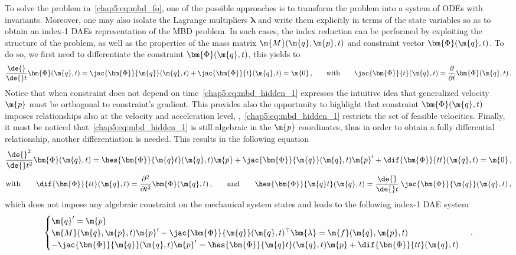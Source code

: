 To solve the problem in~\eqref{chap5:eq:mbd_fo}, one of the possible approaches is to transform the problem into a system of \acp{ODE} with invariants. Moreover, one may also isolate the Lagrange multipliers $\bm{\lambda}$ and write them explicitly in terms of the state variables so as to obtain an index-1 \acp{DAE} representation of the \ac{MBD} problem. In such cases, the index reduction can be performed by exploiting the structure of the problem, as well as the properties of the mass matrix $\m{M}(\m{q}, \m{p}, t)$ and constraint vector $\bm{\Phi}(\m{q}, t)$. To do so, we first need to differentiate the constraint $\bm{\Phi}(\m{q}, t)$, this yields to
%
\begin{equation}
  \dfrac{\de{}}{\de{} t}\bm{\Phi}(\m{q}, t) = \jac{\bm{\Phi}}{\m{q}}(\m{q}, t) + \jac{\bm{\Phi}}{t}(\m{q}, t) = \m{0}
  \, \text{,}
  \qquad \text{with} \qquad \jac{\bm{\Phi}}{t}(\m{q}, t) = \dfrac{\partial}{\partial t}\bm{\Phi}(\m{q}, t)
  \, \text{.}
  \label{chap5:eq:mbd_hidden_1}
\end{equation}
%
Notice that when constraint does not depend on time~\eqref{chap5:eq:mbd_hidden_1} expresses the intuitive idea that generalized velocity $\m{p}$ must be orthogonal to constraint's gradient. This provides also the opportunity to highlight that constraint $\bm{\Phi}(\m{q}, t)$ imposes relationships also at the velocity and acceleration level, \ie{},~\eqref{chap5:eq:mbd_hidden_1} restricts the set of feasible velocities. Finally, it must be noticed that~\eqref{chap5:eq:mbd_hidden_1} is still algebraic in the $\m{p}$ coordinates, thus in order to obtain a fully differential relationship, another differentiation is needed. This results in the following equation
%
\begin{equation}
  \dfrac{\de{}^2}{\de{}t^2}\bm{\Phi}(\m{q}, t) = \hes{\bm{\Phi}}{\m{q}t}(\m{q}, t)\m{p} + \jac{\bm{\Phi}}{\m{q}}(\m{q}, t)\m{p}^{\prime} + \dif{\bm{\Phi}}{tt}(\m{q}, t) = \m{0} \, \text{,}
  \label{chap5:eq:mbd_hidden_2}
\end{equation}
\begin{equation*}
  \text{with} \qquad
  \dif{\bm{\Phi}}{tt}(\m{q}, t) = \dfrac{\partial^2}{\partial t^2}\bm{\Phi}(\m{q}, t) \, \text{,}
  \qquad \text{and} \qquad
  \hes{\bm{\Phi}}{\m{q}t}(\m{q}, t) = \dfrac{\de{}}{\de{} t}\,\jac{\bm{\Phi}}{\m{q}}(\m{q}, t) \, \text{,}
\end{equation*}
%
which does not impose any algebraic constraint on the mechanical system states and leads to the following index-1 \ac{DAE} system
%
\begin{equation}
  \begin{cases}
    \m{q}^{\prime} = \m{p} \\
    \m{M}(\m{q}, \m{p}, t)\m{p}^{\prime} - \jac{\bm{\Phi}}{\m{q}}(\m{q}, t)^{\top}\bm{\lambda} = \m{f}(\m{q},\m{p},t) \\
    -\jac{\bm{\Phi}}{\m{q}}(\m{q}, t)\m{p}^{\prime} = \hes{\bm{\Phi}}{\m{q}t}(\m{q}, t)\m{p} + \dif{\bm{\Phi}}{tt}(\m{q}, t)
  \end{cases} \, \text{.}
  \label{chap5:eq:mbd_ode}
\end{equation}
